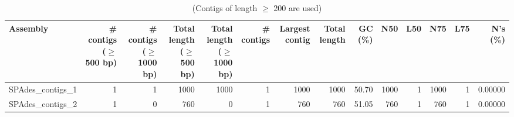 \begin{table}[ht]
\begin{center}
\caption{(Contigs of length $\geq$ 200 are used)}
\begin{tabular}{|l*{13}{|r}|}
\hline
Assembly & \# contigs ($\geq$ 500 bp) & \# contigs ($\geq$ 1000 bp) & Total length ($\geq$ 500 bp) & Total length ($\geq$ 1000 bp) & \# contigs & Largest contig & Total length & GC (\%) & N50 & L50 & N75 & L75 & N's (\%) \\ \hline
SPAdes\_contigs\_1 & 1 & 1 & 1000 & 1000 & 1 & 1000 & 1000 & 50.70 & 1000 & 1 & 1000 & 1 & 0.00000 \\ \hline
SPAdes\_contigs\_2 & 1 & 0 & 760 & 0 & 1 & 760 & 760 & 51.05 & 760 & 1 & 760 & 1 & 0.00000 \\ \hline
\end{tabular}
\end{center}
\end{table}

